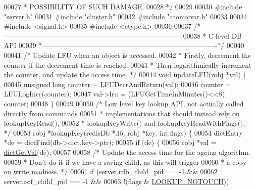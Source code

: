 \begin{DoxyCode}
00027 \textcolor{comment}{ * POSSIBILITY OF SUCH DAMAGE.}
00028 \textcolor{comment}{ */}
00029 
00030 \textcolor{preprocessor}{#}\textcolor{preprocessor}{include} \hyperlink{server_8h}{"server.h"}
00031 \textcolor{preprocessor}{#}\textcolor{preprocessor}{include} \hyperlink{cluster_8h}{"cluster.h"}
00032 \textcolor{preprocessor}{#}\textcolor{preprocessor}{include} \hyperlink{atomicvar_8h}{"atomicvar.h"}
00033 
00034 \textcolor{preprocessor}{#}\textcolor{preprocessor}{include} \textcolor{preprocessor}{<}\textcolor{preprocessor}{signal}\textcolor{preprocessor}{.}\textcolor{preprocessor}{h}\textcolor{preprocessor}{>}
00035 \textcolor{preprocessor}{#}\textcolor{preprocessor}{include} \textcolor{preprocessor}{<}\textcolor{preprocessor}{ctype}\textcolor{preprocessor}{.}\textcolor{preprocessor}{h}\textcolor{preprocessor}{>}
00036 
00037 \textcolor{comment}{/*-----------------------------------------------------------------------------}
00038 \textcolor{comment}{ * C-level DB API}
00039 \textcolor{comment}{ *----------------------------------------------------------------------------*/}
00040 
00041 \textcolor{comment}{/* Update LFU when an object is accessed.}
00042 \textcolor{comment}{ * Firstly, decrement the counter if the decrement time is reached.}
00043 \textcolor{comment}{ * Then logarithmically increment the counter, and update the access time. */}
00044 \textcolor{keywordtype}{void} updateLFU(robj *val) \{
00045     \textcolor{keywordtype}{unsigned} \textcolor{keywordtype}{long} counter = LFUDecrAndReturn(val);
00046     counter = LFULogIncr(counter);
00047     val->lru = (LFUGetTimeInMinutes()<<8) | counter;
00048 \}
00049 
00050 \textcolor{comment}{/* Low level key lookup API, not actually called directly from commands}
00051 \textcolor{comment}{ * implementations that should instead rely on lookupKeyRead(),}
00052 \textcolor{comment}{ * lookupKeyWrite() and lookupKeyReadWithFlags(). */}
00053 robj *lookupKey(redisDb *db, robj *key, \textcolor{keywordtype}{int} flags) \{
00054     dictEntry *de = dictFind(db->dict,key->ptr);
00055     \textcolor{keywordflow}{if} (de) \{
00056         robj *val = \hyperlink{dict_8h_ae8d2cc391873b2bea2b87c4f80f43120}{dictGetVal}(de);
00057 
00058         \textcolor{comment}{/* Update the access time for the ageing algorithm.}
00059 \textcolor{comment}{         * Don't do it if we have a saving child, as this will trigger}
00060 \textcolor{comment}{         * a copy on write madness. */}
00061         \textcolor{keywordflow}{if} (server.rdb\_child\_pid == -1 &&
00062             server.aof\_child\_pid == -1 &&
00063             !(flags & \hyperlink{server_8h_aedc57e62fa05a1b438fa4ed16a803718}{LOOKUP\_NOTOUCH}))

\end{DoxyCode}
